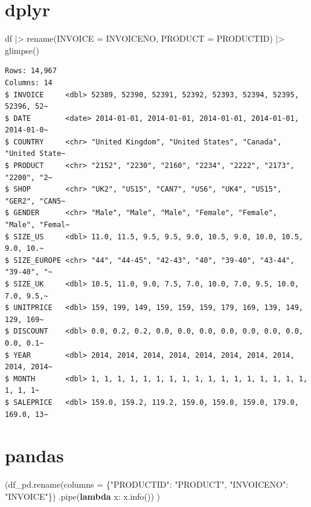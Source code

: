 \documentclass[
  letterpaper,
  DIV=11,
  numbers=noendperiod]{scrreprt}
\newenvironment{Shaded}{\begin{snugshade}}{\end{snugshade}}
\newcommand{\AttributeTok}[1]{\textcolor[rgb]{0.40,0.45,0.13}{#1}}
\newcommand{\FunctionTok}[1]{\textcolor[rgb]{0.28,0.35,0.67}{#1}}
\newcommand{\KeywordTok}[1]{\textcolor[rgb]{0.00,0.23,0.31}{\textbf{#1}}}
\newcommand{\NormalTok}[1]{\textcolor[rgb]{0.00,0.23,0.31}{#1}}
\newcommand{\OperatorTok}[1]{\textcolor[rgb]{0.37,0.37,0.37}{#1}}
\newcommand{\SpecialCharTok}[1]{\textcolor[rgb]{0.37,0.37,0.37}{#1}}
\newcommand{\StringTok}[1]{\textcolor[rgb]{0.13,0.47,0.30}{#1}}
\begin{document}
\section{dplyr}

\begin{Shaded}
\begin{Highlighting}[]
\NormalTok{df }\SpecialCharTok{|\textgreater{}}
    \FunctionTok{rename}\NormalTok{(}\AttributeTok{INVOICE =}\NormalTok{ INVOICENO,}
    \AttributeTok{PRODUCT =}\NormalTok{ PRODUCTID) }\SpecialCharTok{|\textgreater{}}
    \FunctionTok{glimpse}\NormalTok{()}
\end{Highlighting}
\end{Shaded}

\begin{verbatim}
Rows: 14,967
Columns: 14
$ INVOICE     <dbl> 52389, 52390, 52391, 52392, 52393, 52394, 52395, 52396, 52~
$ DATE        <date> 2014-01-01, 2014-01-01, 2014-01-01, 2014-01-01, 2014-01-0~
$ COUNTRY     <chr> "United Kingdom", "United States", "Canada", "United State~
$ PRODUCT     <chr> "2152", "2230", "2160", "2234", "2222", "2173", "2200", "2~
$ SHOP        <chr> "UK2", "US15", "CAN7", "US6", "UK4", "US15", "GER2", "CAN5~
$ GENDER      <chr> "Male", "Male", "Male", "Female", "Female", "Male", "Femal~
$ SIZE_US     <dbl> 11.0, 11.5, 9.5, 9.5, 9.0, 10.5, 9.0, 10.0, 10.5, 9.0, 10.~
$ SIZE_EUROPE <chr> "44", "44-45", "42-43", "40", "39-40", "43-44", "39-40", "~
$ SIZE_UK     <dbl> 10.5, 11.0, 9.0, 7.5, 7.0, 10.0, 7.0, 9.5, 10.0, 7.0, 9.5,~
$ UNITPRICE   <dbl> 159, 199, 149, 159, 159, 159, 179, 169, 139, 149, 129, 169~
$ DISCOUNT    <dbl> 0.0, 0.2, 0.2, 0.0, 0.0, 0.0, 0.0, 0.0, 0.0, 0.0, 0.0, 0.1~
$ YEAR        <dbl> 2014, 2014, 2014, 2014, 2014, 2014, 2014, 2014, 2014, 2014~
$ MONTH       <dbl> 1, 1, 1, 1, 1, 1, 1, 1, 1, 1, 1, 1, 1, 1, 1, 1, 1, 1, 1, 1~
$ SALEPRICE   <dbl> 159.0, 159.2, 119.2, 159.0, 159.0, 159.0, 179.0, 169.0, 13~
\end{verbatim}

\section{pandas}

\begin{Shaded}
\begin{Highlighting}[]
\NormalTok{(df\_pd.rename(columns }\OperatorTok{=}\NormalTok{ \{}\StringTok{"PRODUCTID"}\NormalTok{: }\StringTok{"PRODUCT"}\NormalTok{, }\StringTok{"INVOICENO"}\NormalTok{: }\StringTok{"INVOICE"}\NormalTok{\})}
\NormalTok{     .pipe(}\KeywordTok{lambda}\NormalTok{ x: x.info())}
\NormalTok{)}
\end{Highlighting}
\end{Shaded}
\end{document}
